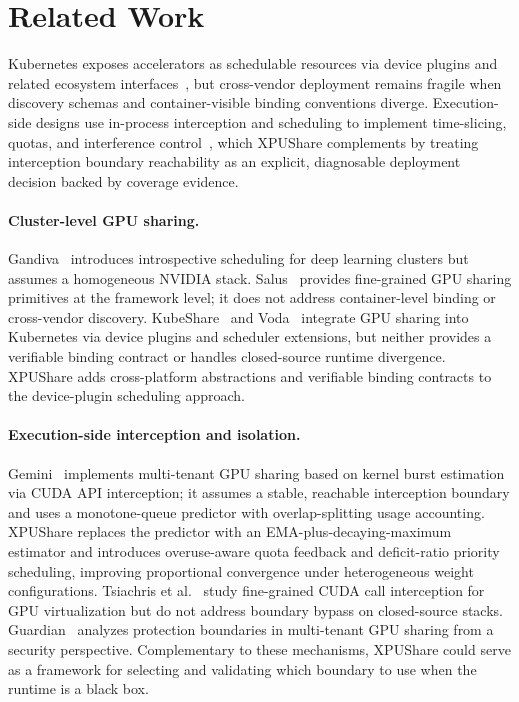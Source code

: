 \documentclass[runningheads,a4paper]{llncs}
\begin{document}
\section{Related Work}
\label{sec:related}

Kubernetes exposes accelerators as schedulable resources via device plugins
and related ecosystem interfaces~\cite{gpushare-extender,voda,k8s-device-plugin,nvidia-device-plugin,kubeshare},
but cross-vendor deployment remains fragile when discovery schemas and
container-visible binding conventions diverge. Execution-side designs use
in-process interception and scheduling to implement time-slicing, quotas,
and interference control~\cite{gemini,cuda-interception,orion}, which XPUShare complements by treating interception boundary reachability as an
explicit, diagnosable deployment decision backed by coverage evidence.

\paragraph{Cluster-level GPU sharing.}
Gandiva~\cite{gandiva} introduces introspective scheduling for deep
learning clusters but assumes a homogeneous NVIDIA stack.
Salus~\cite{salus} provides fine-grained GPU sharing primitives at the
framework level; it does not address container-level binding or
cross-vendor discovery. KubeShare~\cite{kubeshare} and
Voda~\cite{voda} integrate GPU sharing into Kubernetes via device plugins
and scheduler extensions, but neither provides a verifiable binding
contract or handles closed-source runtime divergence. 
XPUShare adds cross-platform abstractions and
verifiable binding contracts to the device-plugin scheduling approach.

\paragraph{Execution-side interception and isolation.}
Gemini~\cite{gemini} implements multi-tenant GPU sharing based on kernel
burst estimation via CUDA API interception; it assumes a stable,
reachable interception boundary and uses a monotone-queue predictor with
overlap-splitting usage accounting. XPUShare replaces the predictor with
an EMA-plus-decaying-maximum estimator and introduces overuse-aware quota
feedback and deficit-ratio priority scheduling, improving proportional
convergence under heterogeneous weight configurations. Tsiachris et
al.~\cite{cuda-interception} study fine-grained CUDA call interception
for GPU virtualization but do not address boundary bypass on closed-source
stacks. Guardian~\cite{guardian} analyzes protection boundaries in
multi-tenant GPU sharing from a security perspective. Complementary to these mechanisms, XPUShare could serve as a framework for selecting and
validating which boundary to use when the runtime is a black box.
\end{document}
